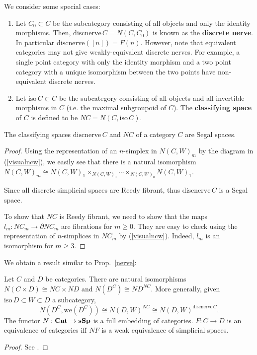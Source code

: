 \begin{refsection}
We consider some special cases:
\begin{eg}\label{nerveeg}
\begin{enumerate}
\item Let $C_0\subset C$ be the subcategory consisting of all objects and only the identity morphisms. Then, $\mathrm{discnerve}\,C=N(C,C_0)$ is known as the \textbf{discrete nerve}. In particular $\mathrm{discnerve}([n])=F(n)$. However, note that equivalent categories may not give weakly-equivalent discrete nerves. For example, a single point category with only the identity morphism and a two point category with a unique isomorphism between the two points have non-equivalent discrete nerves.

\item Let $\mathrm{iso}\,C\subset C$ be the subcategory consisting of all objects and all invertible morphisms in $C$ (i.e. the maximal subgroupoid of $C$). The \textbf{classifying space} of $C$ is defined to be $NC=N(C,\mathrm{iso}\,C)$.
\end{enumerate}
\end{eg}

\begin{prop}
The classifying spaces $\mathrm{discnerve}\,C$ and $NC$ of a category $C$ are Segal spaces.
\end{prop}
\begin{proof}
Using the representation of an $n$-simplex in $N(C,W)_m$ by the diagram in (\ref{visualncw}), we easily see that there is a natural isomorphism $N(C,W)_m\cong N(C,W)_1\times_{N(C,W)_0}\cdots\times_{N(C,W)_0}N(C,W)_1$.

Since all discrete simplicial spaces are Reedy fibrant, thus $\mathrm{discnerve}\,C$ is a Segal space.

To show that $NC$ is Reedy fibrant, we need to show that the maps $l_m:NC_m\to\partial NC_m$ are fibrations for $m\ge0$. They are easy to check using the representation of $n$-simplices in $NC_m$ by (\ref{visualncw}). Indeed, $l_m$ is an isomorphism for $m\ge 3$.
\end{proof}

We obtain a result similar to Prop.~\ref{nerve}:
\begin{prop}\label{nerveprop}
Let $C$ and $D$ be categories. There are natural isomorphisms $N(C\times D)\cong NC\times ND$ and $N(D^C)\cong ND^{NC}$. More generally, given $\mathrm{iso}\,D\subset W\subset D$ a subcategory,
\begin{equation} \label{nfuncat}
N(D^C,\mathrm{we}(D^C))\cong N(D,W)^{NC}\cong N(D,W)^{\mathrm{discnerve}\,C}.
\end{equation}
The functor $N:\mathbf{Cat}\to \mathbf{sSp}$ is a full embedding of categories. $F:C\to D$ is an equivalence of categories iff $NF$ is a weak equivalence of simplicial spaces.
\end{prop}
\begin{proof}
See \cite[Thm 3.7, Prop 3.11]{rezk}.
\end{proof}


\end{refsection}
